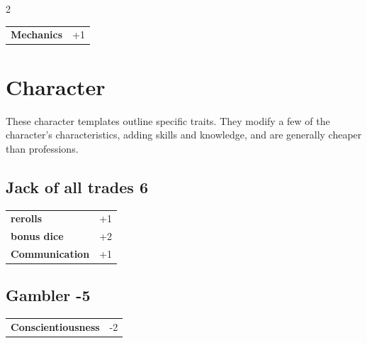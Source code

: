 \begin{multicols}{2}
\begin{tcolorbox}
\begin{tabular}{@{}ll@{}}
    \textbf{Mechanics} & +1\\
\end{tabular}


\end{tcolorbox}

\section{Character}

These character templates outline specific traits. They modify a few of the character's characteristics, adding skills and knowledge, and are generally cheaper than professions.

\begin{tcolorbox}
    \subsection*{Jack of all trades \hfill \small{6 }}
    \tcblower




\begin{tabular}{@{}ll@{}}
    \textbf{rerolls} & +1\\
    \textbf{bonus dice} & +2\\
    \textbf{Communication} & +1\\
\end{tabular}


\end{tcolorbox}

\begin{tcolorbox}
    \subsection*{Gambler \hfill \small{-5 }}
    \tcblower




\begin{tabular}{@{}ll@{}}
    \textbf{Conscientiousness} & -2\\
\end{tabular}


\end{tcolorbox}
\end{multicols}

